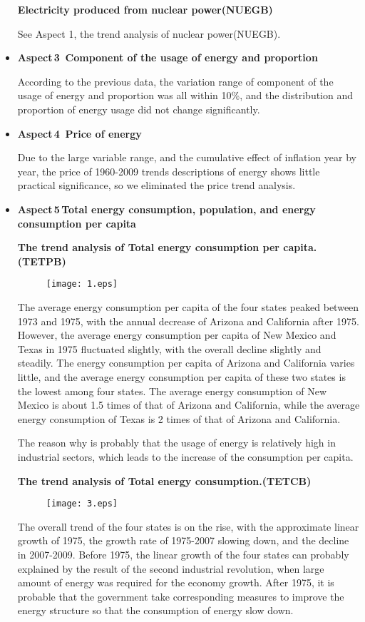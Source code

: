 \begin{itemize}
\textbf{Electricity produced from nuclear power(NUEGB)} 



See Aspect 1, the trend analysis of  nuclear power(NUEGB).


\item \textbf{Aspect\,3 \,Component of the usage of energy and  proportion}


According to the previous data, the variation range of component of the usage of energy and proportion was all within 10\%, and the distribution and proportion of energy usage did not change significantly.
\item \textbf{Aspect\,4 \,Price of energy}


Due to the large variable range, and the cumulative effect of inflation year by year, the price of 1960-2009 trends descriptions of energy shows little practical significance, so we eliminated the price trend analysis.
\item \textbf{Aspect\,5\,Total energy consumption, population, and energy consumption per capita}


\textbf{The trend analysis of Total energy consumption per capita.(TETPB)} 
\begin{figure}[h]

\centering
\texttt{[image: 1.eps]}

\end{figure}



The average energy consumption per capita of the four states peaked between 1973 and 1975, with the annual decrease of Arizona and California after 1975. However, the average energy consumption per capita of New Mexico and Texas in 1975 fluctuated slightly, with the overall decline slightly and steadily. The energy consumption per capita of Arizona and California varies little, and the average energy consumption per capita of these two states is the lowest among four states. The average energy consumption of New Mexico is about 1.5 times of that of Arizona and California, while the average energy consumption of Texas is 2 times of that of Arizona and California.


The reason why is probably that the usage of energy is relatively high in industrial sectors, which leads to the increase of the consumption per capita.


\textbf{The trend analysis of Total energy consumption.(TETCB)} 
\begin{figure}[h]

\centering
\texttt{[image: 3.eps]}

\end{figure}
The overall trend of the four states is on the rise, with the approximate linear growth of 1975, the growth rate of 1975-2007 slowing down, and the decline in 2007-2009. Before 1975, the linear growth of the four states can probably explained by the result of the second industrial revolution, when large amount of energy was required for the economy growth. After 1975, it is probable that the government take  corresponding measures to improve the energy structure so that the consumption of energy slow down.

\end{itemize}

